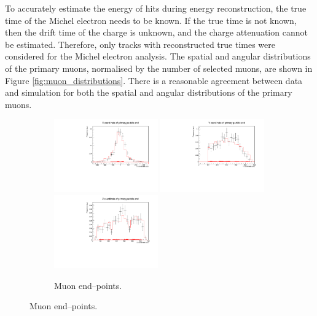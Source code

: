 To accurately estimate the energy of hits during energy reconstruction, the 
true time of the Michel electron needs to be known. If the true time is not
known, then the drift time of the charge is unknown, and the charge attenuation
cannot be estimated. Therefore, only tracks with reconstructed true times were
considered for the Michel electron analysis. The spatial and angular
distributions of the primary muons, normalised by the number of selected 
muons, are shown in Figure \ref{fig:muon_distributions}. There is a reasonable 
agreement between data and simulation for both the spatial and angular
distributions of the primary muons.
\begin{figure}

	\centering

	\begin{subfigure}[b]{\textwidth}
		\centering
		\includegraphics[width=0.49\textwidth]{figures/DataVMC_primary_EndX.pdf}
		\hfill
		\includegraphics[width=0.49\textwidth]{figures/DataVMC_primary_EndY.pdf}
		\includegraphics[width=0.49\textwidth]{figures/DataVMC_primary_EndZ.pdf}
		\caption {Muon end--points.}
		\label{fig:muon_endpoints}
	\end{subfigure}


\end{figure}
